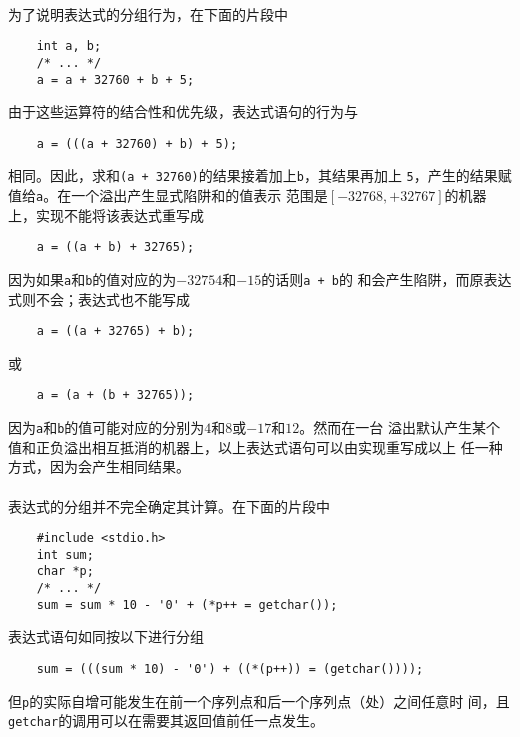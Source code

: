 \paragraph{}
\ex 为了说明表达式的分组行为，在下面的片段中
\begin{lstlisting}
    int a, b;
    /* ... */
    a = a + 32760 + b + 5;
\end{lstlisting}
由于这些运算符的结合性和优先级，表达式语句的行为与
\begin{lstlisting}
    a = (((a + 32760) + b) + 5);
\end{lstlisting}
相同。因此，求和\texttt{(a + 32760)}的结果接着加上\texttt{b}，其结果再加上
\texttt{5}，产生的结果赋值给\texttt{a}。在一个溢出产生显式陷阱和的值表示
范围是$[-32768, +32767]$的机器上，实现不能将该表达式重写成
\begin{lstlisting}
    a = ((a + b) + 32765);
\end{lstlisting}
因为如果\texttt{a}和\texttt{b}的值对应的为$-32754$和$-15$的话则\texttt{a + b}的
和会产生陷阱，而原表达式则不会；表达式也不能写成
\begin{lstlisting}
    a = ((a + 32765) + b);
\end{lstlisting}
或
\begin{lstlisting}
    a = (a + (b + 32765));
\end{lstlisting}
因为\texttt{a}和\texttt{b}的值可能对应的分别为$4$和$8$或$-17$和$12$。然而在一台
溢出默认产生某个值和正负溢出相互抵消的机器上，以上表达式语句可以由实现重写成以上
任一种方式，因为会产生相同结果。

\paragraph{}
\ex 表达式的分组并不完全确定其计算。在下面的片段中
\begin{lstlisting}
    #include <stdio.h>
    int sum;
    char *p;
    /* ... */
    sum = sum * 10 - '0' + (*p++ = getchar());
\end{lstlisting}
表达式语句如同按以下进行分组
\begin{lstlisting}
    sum = (((sum * 10) - '0') + ((*(p++)) = (getchar())));
\end{lstlisting}
但\texttt{p}的实际自增可能发生在前一个序列点和后一个序列点（\tm{;}处）之间任意时
间，且\texttt{getchar}的调用可以在需要其返回值前任一点发生。


